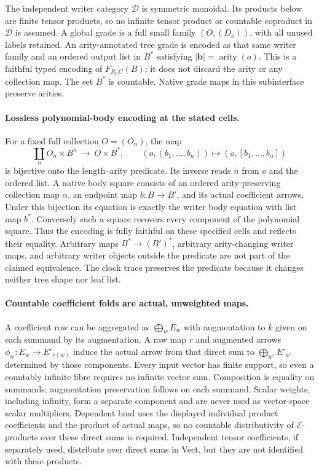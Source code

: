 \documentclass[11pt]{article}
\newcommand{\E}{\mathcal E}\newcommand{\RR}{\overline{\mathbb R}_{\geq0}}
\begin{document}
The independent writer category $\mathcal D$ is symmetric monoidal. Its products below are finite tensor products, so no infinite tensor product or countable coproduct in $\mathcal D$ is assumed. A global grade is a full small family $(O,(D_o))$, with all unused labels retained. An arity-annotated tree grade is encoded as that same writer family and an ordered output list in $B^*$ satisfying $|\mathbf b|=\operatorname{arity}(o)$. This is a faithful typed encoding of $F_{R_UC}(B)$; it does not discard the arity or any collection map. The set $B^*$ is countable. Native grade maps in this subinterface preserve arities.

\paragraph{Lossless polynomial-body encoding at the stated cells.}
For a fixed full collection $O=(O_n)$, the map
\[
 \coprod_n O_n\times B^n\ \longrightarrow\ O\times B^*,
 \qquad(o,(b_1,\ldots,b_n))\longmapsto(o,[b_1,\ldots,b_n])
\]
is bijective onto the length--arity predicate. Its inverse reads $n$ from $o$ and the ordered list. A native body square consists of an ordered arity-preserving collection map $\alpha$, an endpoint map $b:B\to B'$, and its actual coefficient arrows. Under this bijection its equation is exactly the writer body equation with list map $b^*$. Conversely such a square recovers every component of the polynomial square. Thus the encoding is fully faithful on these specified cells and reflects their equality. Arbitrary maps $B^*\to(B')^*$, arbitrary arity-changing writer maps, and arbitrary writer objects outside the predicate are not part of the claimed equivalence. The clock trace preserves the predicate because it changes neither tree shape nor leaf list.

\paragraph{Countable coefficient folds are actual, unweighted maps.}
A coefficient row can be aggregated as $\bigoplus_w E_w$ with augmentation to $k$ given on each summand by its augmentation. A raw map $r$ and augmented arrows $\phi_w:E_w\to E'_{r(w)}$ induce the actual arrow from that direct sum to $\bigoplus_{w'}E'_{w'}$ determined by those components. Every input vector has finite support, so even a countably infinite fibre requires no infinite vector sum. Composition is equality on summands; augmentation preservation follows on each summand. Scalar weights, including infinity, form a separate component and are never used as vector-space scalar multipliers. Dependent bind uses the displayed individual product coefficients and the product of actual maps, so no countable distributivity of $\E$-products over these direct sums is required. Independent tensor coefficients, if separately used, distribute over direct sums in Vect, but they are not identified with these products.
\end{document}
